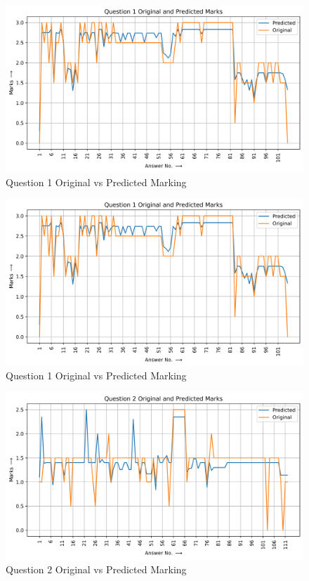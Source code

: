 \begin{figure}[H]
    \centering
    \includegraphics[width=1\linewidth]{IMAGE/Marking.png}
    \caption{Question 1 Original vs Predicted Marking}
    \label{fig31}
\end{figure}


\begin{figure}[H]
    \centering
    \includegraphics[width=1\linewidth]{IMAGE/Marking.png}
    \caption{Question 1 Original vs Predicted Marking}
    \label{fig31}
\end{figure}

\begin{figure}[H]
    \centering
    \includegraphics[width=1\linewidth]{IMAGE/q2_Marking.png}
    \caption{Question 2 Original vs Predicted Marking}
    \label{fig32}
\end{figure}

